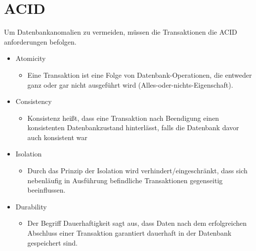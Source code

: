 \section{ACID}

Um Datenbankanomalien zu vermeiden, müssen die Transaktionen die ACID anforderungen befolgen.

\begin{itemize}
  \item Atomicity
  \begin{itemize}
    \item Eine Transaktion ist eine Folge von Datenbank-Operationen, die entweder ganz oder gar nicht ausgeführt wird (Alles-oder-nichts-Eigenschaft).
  \end{itemize}
  \item Consistency
  \begin{itemize}
    \item Konsistenz heißt, dass eine Transaktion nach Beendigung einen konsistenten Datenbankzustand hinterlässt, falls die Datenbank davor auch konsistent war
  \end{itemize}
  \item Isolation 
  \begin{itemize}
    \item Durch das Prinzip der Isolation wird verhindert/eingeschränkt, dass sich nebenläufig in Ausführung befindliche Transaktionen gegenseitig beeinflussen.
  \end{itemize}
  \item Durability
  \begin{itemize}
    \item Der Begriff Dauerhaftigkeit sagt aus, dass Daten nach dem erfolgreichen Abschluss einer Transaktion garantiert dauerhaft in der Datenbank gespeichert sind.
  \end{itemize}
\end{itemize}